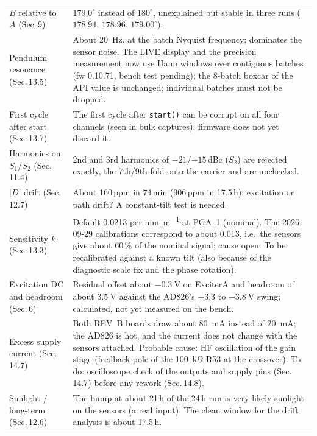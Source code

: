 \documentclass[11pt,a4paper]{article}
\begin{document}
\begin{center}
\begin{tabular}{@{}p{}p{}@{}}
$B$ relative to $A$ (Sec.\,9) &
$179.0^\circ$ instead of $180^\circ$, unexplained but stable in three runs
($178.94$, $178.96$, $179.00^\circ$). \\
Pendulum resonance (Sec.\,13.5) &
About \SI{20}{\hertz}, at the batch Nyquist frequency; dominates the
sensor noise.  The LIVE display and the precision measurement now use Hann
windows over contiguous batches (fw 0.10.71, bench test pending); the 8-batch
boxcar of the API value is unchanged; individual batches must not be dropped. \\
First cycle after start (Sec.\,13.7) &
The first cycle after \texttt{start()} can be corrupt on all four channels
(seen in bulk captures); firmware does not yet discard it. \\
Harmonics on $S_1$/$S_2$ (Sec.\,11.4) &
2nd and 3rd harmonics of $-21$/$-15$\,dBc ($S_2$) are rejected exactly, the
7th/9th fold onto the carrier and are unchecked. \\
$|\underline{D}|$ drift (Sec.\,12.7) &
About 160\,ppm in 74\,min (906\,ppm in 17.5\,h): excitation or path drift?
A constant-tilt test is needed. \\
Sensitivity $k$ (Sec.\,13.3) &
Default 0.0213 per \si{\milli\metre\per\metre} at PGA~1 (nominal).  The 2026-09-29
calibrations correspond to about 0.013, i.e.\ the sensors give about 60\,\% of the
nominal signal; cause open.  To be recalibrated against a known tilt (also because of
the diagnostic scale fix and the phase rotation). \\
Excitation DC and headroom (Sec.\,6) &
Residual offset about $\SI{-0.3}{\volt}$ on ExciterA and headroom of about
$\SI{3.5}{\volt}$ against the AD826's $\pm3.3$ to $\pm\SI{3.8}{\volt}$ swing;
calculated, not yet measured on the bench. \\
Excess supply current (Sec.\,14.7) &
Both REV~B boards draw about \SI{80}{\milli\ampere} instead of \SI{20}{\milli\ampere};
the AD826 is hot, and the current does not change with the sensors attached.  Probable
cause: HF oscillation of the gain stage (feedback pole of the \SI{100}{\kilo\ohm} R53 at the
crossover).  To do: oscilloscope check of the outputs and supply pins (Sec.\,14.7) before any
rework (Sec.\,14.8). \\
Sunlight / long-term (Sec.\,12.6) &
The bump at about 21\,h of the 24\,h run is very likely sunlight on the
sensors (a real input).  The clean window for the drift analysis is about
17.5\,h. \\
\bottomrule
\end{tabular}
\end{center}
\end{document}

